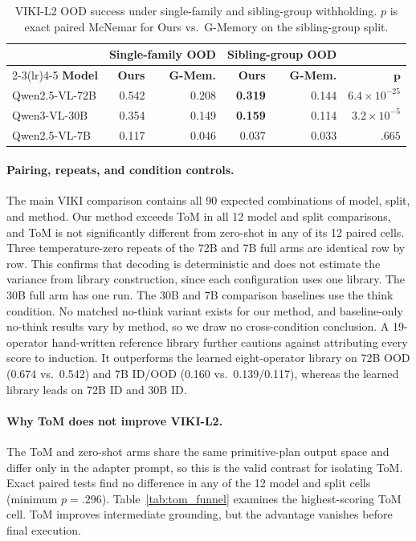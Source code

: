 \documentclass{article}
\theoremstyle{plain}
\theoremstyle{definition}
\theoremstyle{remark}
\begin{document}
\begin{table}[h]
\centering
\caption{VIKI-L2 OOD success under single-family and sibling-group withholding. $p$ is exact paired McNemar for Ours vs.\ G-Memory on the sibling-group split.}
\label{tab:sibling_ood}
\begin{tabular}{@{}lrrrrr@{}}
\toprule
& \multicolumn{2}{c}{\textbf{Single-family OOD}} & \multicolumn{2}{c}{\textbf{Sibling-group OOD}} & \\
\cmidrule(lr){2-3}\cmidrule(lr){4-5}
\textbf{Model} & \textbf{Ours} & \textbf{G-Mem.} & \textbf{Ours} & \textbf{G-Mem.} & $\boldsymbol{p}$ \\
\midrule
Qwen2.5-VL-72B & 0.542 & 0.208 & \textbf{0.319} & 0.144 & $6.4\!\times\!10^{-25}$ \\
Qwen3-VL-30B   & 0.354 & 0.149 & \textbf{0.159} & 0.114 & $3.2\!\times\!10^{-5}$ \\
Qwen2.5-VL-7B  & 0.117 & 0.046 & 0.037 & 0.033 & $.665$ \\
\bottomrule
\end{tabular}
\end{table}

\paragraph{Pairing, repeats, and condition controls.}
The main VIKI comparison contains all 90 expected combinations of model, split, and method. Our method exceeds ToM in all 12 model and split comparisons, and ToM is not significantly different from zero-shot in any of its 12 paired cells. Three temperature-zero repeats of the 72B and 7B full arms are identical row by row. This confirms that decoding is deterministic and does not estimate the variance from library construction, since each configuration uses one library. The 30B full arm has one run. The 30B and 7B comparison baselines use the think condition. No matched no-think variant exists for our method, and baseline-only no-think results vary by method, so we draw no cross-condition conclusion. A 19-operator hand-written reference library further cautions against attributing every score to induction. It outperforms the learned eight-operator library on 72B OOD (0.674 vs.\ 0.542) and 7B ID/OOD (0.160 vs.\ 0.139/0.117), whereas the learned library leads on 72B ID and 30B ID.

\paragraph{Why ToM does not improve VIKI-L2.}
The ToM and zero-shot arms share the same primitive-plan output space and differ only in the adapter prompt, so this is the valid contrast for isolating ToM. Exact paired tests find no difference in any of the 12 model and split cells (minimum $p=.296$). Table~\ref{tab:tom_funnel} examines the highest-scoring ToM cell. ToM improves intermediate grounding, but the advantage vanishes before final execution.
\end{document}
